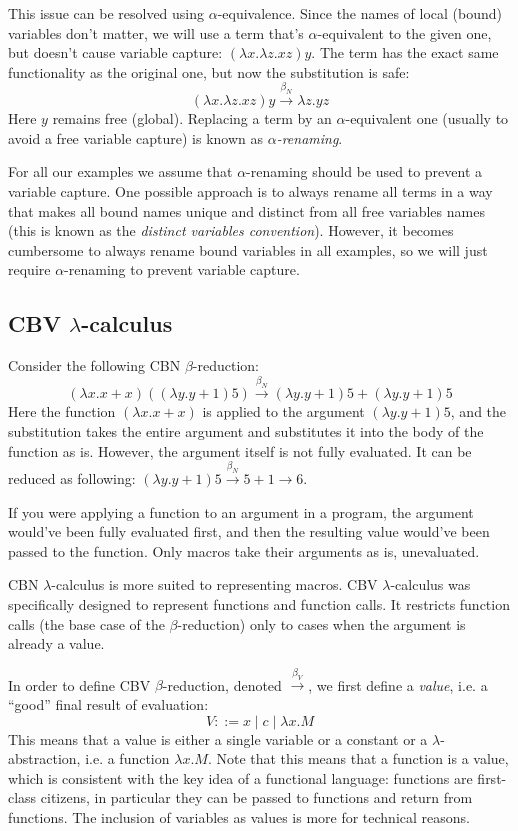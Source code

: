 \documentclass{article}
\newcommand{\lam}{\lambda}
\newcommand{\cbnb}{\overset{\beta_{N}}{\rightarrow}}
\newcommand{\cbvb}{\overset{\beta_{V}}{\rightarrow}}
\begin{document}
This issue can be resolved using $\alpha$-equivalence. Since the names of local (bound) variables don't matter, we will use a term that's $\alpha$-equivalent to the given one, but doesn't cause variable capture: $(\lam x. \lam z.  x z) y$. The term has the exact same functionality as the original one, but now the substitution is safe:
$$
(\lam x. \lam z.  x z) y \cbnb \lam z. y z
$$
Here $y$ remains free (global). Replacing a term by an $\alpha$-equivalent one (usually to avoid a free variable capture) is known as \textit{$\alpha$-renaming}.      

For all our examples we assume that $\alpha$-renaming should be used to prevent a variable capture. One possible approach is to always rename all terms in a way that makes all bound names unique and distinct from all free variables names (this is known as the \textit{distinct variables convention}). However, it becomes cumbersome to always rename bound variables in all examples, so we will just require $\alpha$-renaming to prevent variable capture.                                          

\subsection{CBV $\lam$-calculus}\label{cbv}
Consider the following CBN $\beta$-reduction: 
$$(\lam x. x + x)((\lam y. y + 1) 5) \cbnb (\lam y. y + 1) 5 + (\lam y. y + 1) 5$$
Here the function $(\lam x. x + x)$ is applied to the argument $(\lam y. y + 1) 5$, and the substitution takes the entire argument and substitutes it into the body of the function as is. However, the argument itself is not fully evaluated. It can be reduced as following: $(\lam y. y + 1) 5 \cbnb 5 + 1 \rightarrow 6$. 

If you were applying a function to an argument in a program, the argument would've been fully evaluated first, and then the resulting value would've been passed to the function.  Only macros take their arguments as is, unevaluated. 

CBN $\lam$-calculus is more suited to representing macros. CBV $\lam$-calculus was specifically designed to represent functions and function calls. It restricts function calls (the base case of the $\beta$-reduction) only to cases when the argument is already a value. 

In order to define CBV $\beta$-reduction, denoted $\cbvb$, we first define a \textit{value}, i.e. a ``good'' final result of evaluation:
$$
V ::= x \mid c \mid \lam x. M
$$
This means that a value is either a single variable or a constant or a $\lam$-abstraction, i.e. a function $\lam x. M$. Note that this means that a function is a value, which is consistent with the key idea of a functional language: functions are first-class citizens, in particular they can be passed to functions and return from functions. The inclusion of variables as values is more for technical reasons. 
\end{document}
